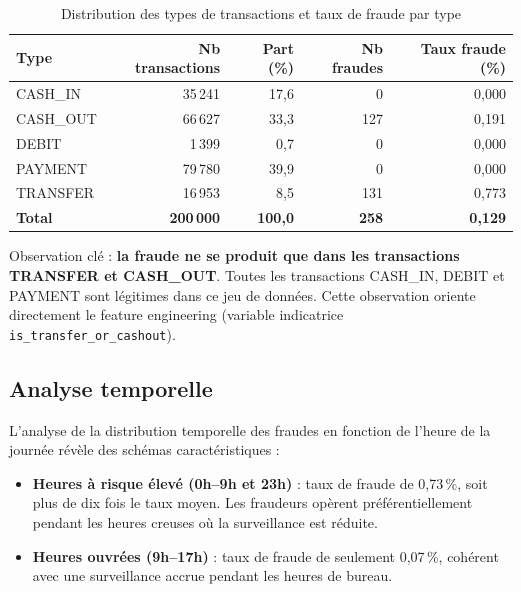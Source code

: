 \documentclass[12pt,a4paper,twoside]{report}
\theoremstyle{definition}
\begin{document}
\begin{table}[H]
\centering
\caption{Distribution des types de transactions et taux de fraude par type}
\label{tab:type_distribution}
\renewcommand{\arraystretch}{1.3}
\begin{tabular}{lrrrr}
\toprule
\textbf{Type} & \textbf{Nb transactions} & \textbf{Part (\%)} & \textbf{Nb fraudes} & \textbf{Taux fraude (\%)} \\
\midrule
CASH\_IN    & 35\,241 & 17,6 & 0   & 0,000 \\
CASH\_OUT   & 66\,627 & 33,3 & 127 & 0,191 \\
DEBIT       & 1\,399  & 0,7  & 0   & 0,000 \\
PAYMENT     & 79\,780 & 39,9 & 0   & 0,000 \\
TRANSFER    & 16\,953 & 8,5  & 131 & 0,773 \\
\midrule
\textbf{Total} & \textbf{200\,000} & \textbf{100,0} & \textbf{258} & \textbf{0,129} \\
\bottomrule
\end{tabular}
\end{table}

\begin{notebox}
Observation clé : \textbf{la fraude ne se produit que dans les transactions TRANSFER
et CASH\_OUT}. Toutes les transactions CASH\_IN, DEBIT et PAYMENT sont légitimes
dans ce jeu de données. Cette observation oriente directement le feature engineering
(variable indicatrice \texttt{is\_transfer\_or\_cashout}).
\end{notebox}

\subsection{Analyse temporelle}

L'analyse de la distribution temporelle des fraudes en fonction de l'heure de la
journée révèle des schémas caractéristiques :

\begin{itemize}
  \item \textbf{Heures à risque élevé (0h--9h et 23h)} : taux de fraude de 0,73\,\%,
    soit plus de dix fois le taux moyen. Les fraudeurs opèrent préférentiellement
    pendant les heures creuses où la surveillance est réduite.
  \item \textbf{Heures ouvrées (9h--17h)} : taux de fraude de seulement 0,07\,\%,
    cohérent avec une surveillance accrue pendant les heures de bureau.
\end{itemize}
\end{document}
